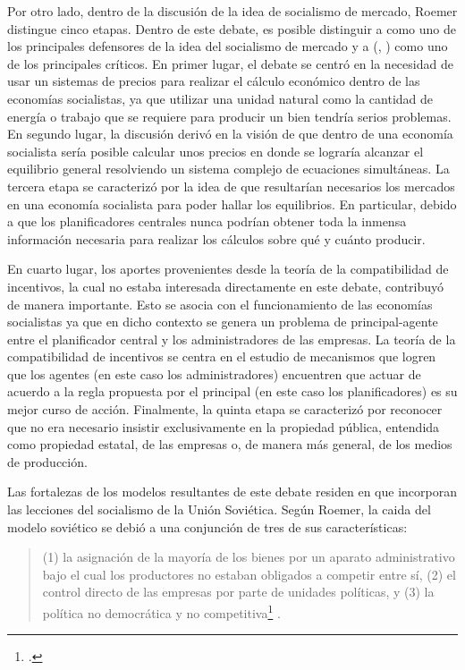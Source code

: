 Por otro lado, dentro de la discusión de la idea de socialismo de mercado, Roemer distingue cinco etapas. Dentro de este debate, es posible distinguir a \citet{Lange_1956} como uno de los principales defensores de la idea del socialismo de mercado y a \citeauthor{Hayek_1935} (\citeyear{Hayek_1935}, \citeyear{Hayek_1940}) como uno de los principales críticos. En primer lugar, el debate se centró en la necesidad de usar un sistemas de precios para realizar el cálculo económico dentro de las economías socialistas, ya que utilizar una unidad natural como la cantidad de energía o trabajo que se requiere para producir un bien tendría serios problemas. En segundo lugar, la discusión derivó en la visión de que dentro de una economía socialista sería posible calcular unos precios en donde se lograría alcanzar el equilibrio general resolviendo un sistema complejo de ecuaciones simultáneas. La tercera etapa se caracterizó por la idea de que resultarían necesarios los mercados en una economía socialista para poder hallar los equilibrios. En particular, debido a que los planificadores centrales nunca podrían obtener toda la inmensa información necesaria para realizar los cálculos sobre qué y cuánto producir.

En cuarto lugar, los aportes provenientes desde la teoría de la compatibilidad de incentivos, la cual no estaba interesada directamente en este debate, contribuyó de manera importante. Esto se asocia con el funcionamiento de las economías socialistas ya que en dicho contexto se genera un problema de principal-agente entre el planificador central y los administradores de las empresas. La teoría de la compatibilidad de incentivos se centra en el estudio de mecanismos que logren que los agentes (en este caso los administradores) encuentren que actuar de acuerdo a la regla propuesta por el principal (en este caso los planificadores) es su mejor curso de acción. Finalmente, la quinta etapa se caracterizó por reconocer que no era necesario insistir exclusivamente en la propiedad pública, entendida como propiedad estatal, de las empresas o, de manera más general, de los medios de producción.

Las fortalezas de los modelos resultantes de este debate residen en que incorporan las lecciones del socialismo de la Unión Soviética. Según Roemer, la caida del modelo soviético se debió a una conjunción de tres de sus características: 


\vspace{3mm}
\begin{quote}
(1) la asignación de la mayoría de los bienes por un aparato administrativo bajo el cual los productores no estaban obligados a competir entre sí, (2) el control directo de las empresas por parte de unidades políticas, y (3) la política no democrática y no competitiva\footnote{ \citep[p. 37]{Roemer_1994}.} \citep[p. 37]{Roemer_1994}.
    
\end{quote}
\vspace{3mm}


